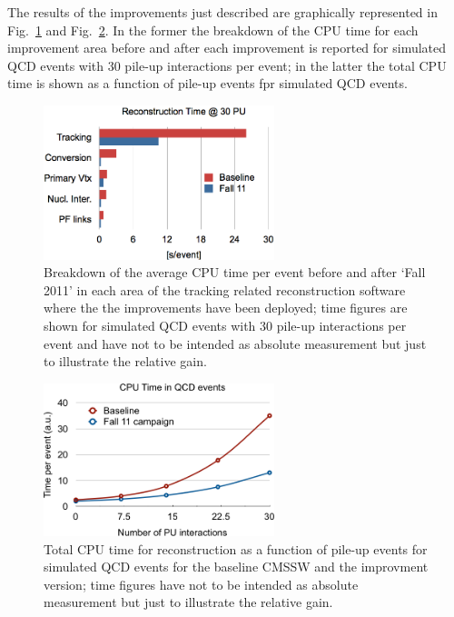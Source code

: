 The results of the improvements just described are graphically
represented in Fig.~\ref{fig:fall11} and Fig.~\ref{fig:fall11vsPU}. In the
former the breakdown of the CPU time for each improvement area before
and after each improvement is reported for simulated QCD events with
30 pile-up interactions per event; in the latter the total CPU time is
shown as a function of pile-up events fpr simulated QCD events.
\begin{figure}[t]
\begin{center}
\includegraphics*[width=0.6\textwidth]{figs/recotime.png}
\caption{Breakdown of the average CPU time per event before and after
  `Fall 2011' in each area of the tracking related reconstruction
  software where the the improvements have been deployed; time figures are
  shown for simulated QCD events with 30 pile-up interactions per
event and have not to be intended as absolute measurement but just to
illustrate the relative gain.}
\label{fig:fall11}
\end{center}
\end{figure}
\begin{figure}[b]
\begin{center}
\includegraphics*[width=0.6\textwidth]{figs/recotime_vs_pu.png}
\caption{Total CPU time for reconstruction as a function of
pile-up events for simulated QCD events for the baseline CMSSW and the
improvment version; time figures have not to be intended as absolute
measurement but just to illustrate the relative gain.}
\label{fig:fall11vsPU}
\end{center}
\end{figure}

